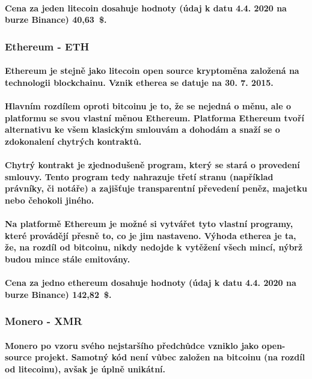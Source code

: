 \documentclass[thesis=B,czech]{FITthesis}[2019/03/21]
\begin{document}
\paragraph{
Cena za jeden litecoin dosahuje hodnoty (údaj k datu 4.4. 2020 na burze Binance) 40,63~\$. \cite{binance_markets}
}
\subsubsection{Ethereum - ETH}
\paragraph{
Ethereum je stejně jako litecoin open source kryptoměna založená na technologii blockchainu. Vznik etherea se datuje na 30. 7. 2015. 
}
\paragraph{
Hlavním rozdílem oproti bitcoinu je to, že se nejedná o měnu, ale o platformu se svou vlastní měnou Ethereum. Platforma Ethereum tvoří alternativu ke všem klasickým smlouvám a dohodám a snaží se o zdokonalení chytrých kontraktů. \cite{btc_vs_eth}
}
\paragraph{
Chytrý kontrakt je zjednodušeně program, který se stará o provedení smlouvy. Tento program tedy nahrazuje třetí stranu (například právníky, či notáře) a zajišťuje transparentní převedení peněz, majetku nebo čehokoli jiného. \cite{ethereum}
}
\paragraph{
Na platformě Ethereum je možné si vytvářet tyto vlastní programy, které provádějí přesně to, co je jim nastaveno. \cite{ethereum} Výhoda etherea je ta, že, na rozdíl od bitcoinu, nikdy nedojde k vytěžení všech mincí, nýbrž budou mince stále emitovány. \cite{alza_monero}
}
\paragraph{
Cena za jedno ethereum dosahuje hodnoty (údaj k datu 4.4. 2020 na burze Binance) 142,82~\$. \cite{binance_markets}
}
\subsubsection{Monero - XMR}
\paragraph{
Monero po vzoru svého nejstaršího předchůdce vzniklo jako open-source projekt. Samotný kód není vůbec založen na bitcoinu (na rozdíl od litecoinu), avšak je úplně unikátní. 
}
\end{document}
